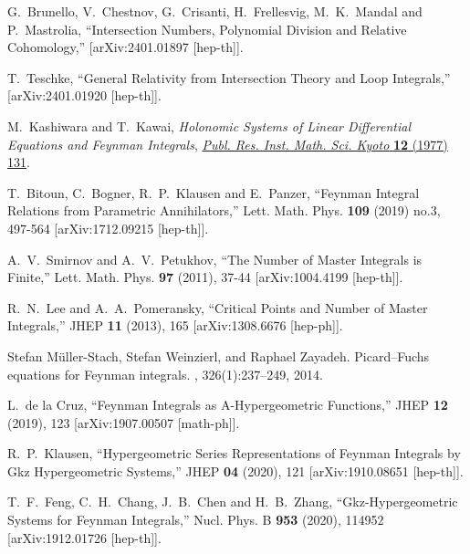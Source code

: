 \documentclass[a4paper,12pt]{article}
\numberwithin{equation}{section}
\numberwithin{figure}{section}
\begin{document}
\begin{thebibliography}{99}
G.~Brunello, V.~Chestnov, G.~Crisanti, H.~Frellesvig, M.~K.~Mandal and P.~Mastrolia,
``Intersection Numbers, Polynomial Division and Relative Cohomology,''
[arXiv:2401.01897 [hep-th]].

T.~Teschke,
``General Relativity from Intersection Theory and Loop Integrals,''
[arXiv:2401.01920 [hep-th]].
  


M.~Kashiwara and T.~Kawai, \emph{{Holonomic Systems of Linear Differential
		Equations and Feynman Integrals}},
\href{https://doi.org/10.2977/prims/1195196602}{\emph{Publ. Res. Inst. Math.
		Sci. Kyoto} {\bfseries 12} (1977) 131}.

  
T.~Bitoun, C.~Bogner, R.~P.~Klausen and E.~Panzer,
``Feynman Integral Relations from Parametric Annihilators,''
Lett. Math. Phys. \textbf{109} (2019) no.3, 497-564
[arXiv:1712.09215 [hep-th]].

A.~V.~Smirnov and A.~V.~Petukhov,
``The Number of Master Integrals is Finite,''
Lett. Math. Phys. \textbf{97} (2011), 37-44
[arXiv:1004.4199 [hep-th]].



R.~N.~Lee and A.~A.~Pomeransky,
``Critical Points and Number of Master Integrals,''
JHEP \textbf{11} (2013), 165
[arXiv:1308.6676 [hep-ph]].



Stefan M{\"u}ller-Stach, Stefan Weinzierl, and Raphael Zayadeh.
\newblock Picard--{F}uchs equations for {F}eynman integrals.
,
326(1):237--249, 2014.
\newblock [arXiv:1212.4389]
  
L.~de la Cruz,
``Feynman Integrals as A-Hypergeometric Functions,''
JHEP \textbf{12} (2019), 123
[arXiv:1907.00507 [math-ph]].

R.~P.~Klausen,
``Hypergeometric Series Representations of Feynman Integrals by Gkz Hypergeometric Systems,''
JHEP \textbf{04} (2020), 121
[arXiv:1910.08651 [hep-th]].
  
T.~F.~Feng, C.~H.~Chang, J.~B.~Chen and H.~B.~Zhang,
``Gkz-Hypergeometric Systems for Feynman Integrals,''
Nucl. Phys. B \textbf{953} (2020), 114952
[arXiv:1912.01726 [hep-th]].


\end{thebibliography}
\end{document}
